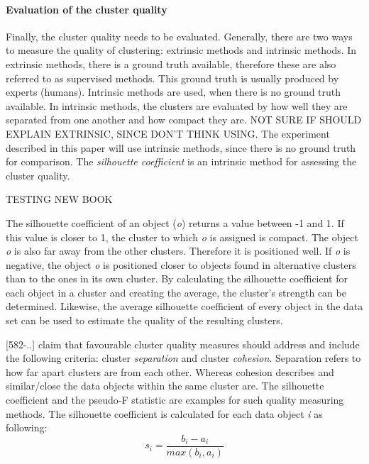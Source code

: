   \paragraph{Evaluation of the cluster quality}
  Finally, the cluster quality needs to be evaluated. Generally, there are two ways to measure the quality of clustering: extrinsic methods and intrinsic methods. In extrinsic methods, there is a ground truth available, therefore these are also referred to as supervised methods. This ground truth is usually produced by experts (humans). Intrinsic methods are used, when there is no ground truth available. In intrinsic methods, the clusters are evaluated by how well they are separated from one another and how compact they are.
  NOT SURE IF SHOULD EXPLAIN EXTRINSIC, SINCE DON'T THINK USING.
  The experiment described in this paper will use intrinsic methods, since there is no ground truth for comparison. The \textit{silhouette coefficient} is an intrinsic method for assessing the cluster quality. 
  
  \textcite{kaufman1990findingGroupsInData}  TESTING NEW BOOK
  
  The silhouette coefficient of an object (\textit{o})  returns a value between -1 and 1. If this value is closer to 1, the cluster to which \textit{o} is assigned is compact. The object \textit{o} is also far away from the other clusters. Therefore it is positioned well. If \textit{o} is negative, the object \textit{o} is positioned closer to objects found in alternative clusters than to the ones in its own cluster.
  By calculating the silhouette coefficient for each object in a cluster and creating the average, the cluster's strength can be determined. Likewise, the average silhouette coefficient of every object in the data set can be used to estimate the quality of the resulting clusters.


  \textcite{DataMiningAndPredictiveAnalytics}[582-..] claim that favourable cluster quality measures should address and include the following criteria: cluster \textit{separation} and cluster \textit{cohesion}. Separation refers to how far apart clusters are from each other. Whereas cohesion describes and similar/close the data objects within the same cluster are. The silhouette coefficient and the pseudo-F statistic are examples for such quality measuring methods. The silhouette coefficient is calculated for each data object \textit{i} as following:
  \[
    s_i = \frac{b_i - a_i}{max(b_i, a_i)}  
  \]

